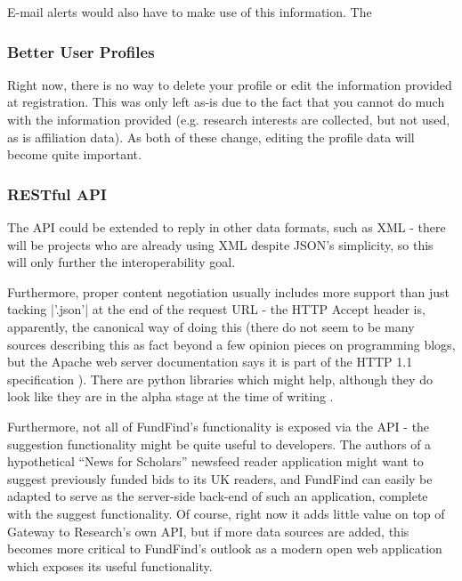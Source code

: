 E-mail alerts would also have to make use of this information. The

\subsubsection{Better User Profiles}
Right now, there is no way to delete your profile or edit the information provided at registration. This was only left as-is due to the fact that you cannot do much with the information provided (e.g. research interests are collected, but not used, as is affiliation data). As both of these change, editing the profile data will become quite important.


\subsubsection{RESTful API}
\label{future-work-api}

The API could be extended to reply in other data formats, such as XML - there will be projects who are already using XML despite JSON's simplicity, so this will only further the interoperability goal.

Furthermore, proper content negotiation usually includes more support than just tacking |'.json'| at the end of the request URL - the HTTP Accept header is, apparently, the canonical way of doing this (there do not seem to be many sources describing this as fact beyond a few opinion pieces on programming blogs, but the Apache web server documentation says it is part of the HTTP 1.1 specification \cite{apache-content-negotiation}). There are python libraries which might help, although they do look like they are in the alpha stage at the time of writing \cite{negotiate} \cite{negotiator}.

Furthermore, not all of FundFind's functionality is exposed via the API - the suggestion functionality might be quite useful to developers. The authors of a hypothetical ``News for Scholars'' newsfeed reader application might want to suggest previously funded bids to its UK readers, and FundFind can easily be adapted to serve as the server-side back-end of such an application, complete with the suggest functionality. Of course, right now it adds little value on top of Gateway to Research's own API, but if more data sources are added, this becomes more critical to FundFind's outlook as a modern open web application which exposes its useful functionality.

